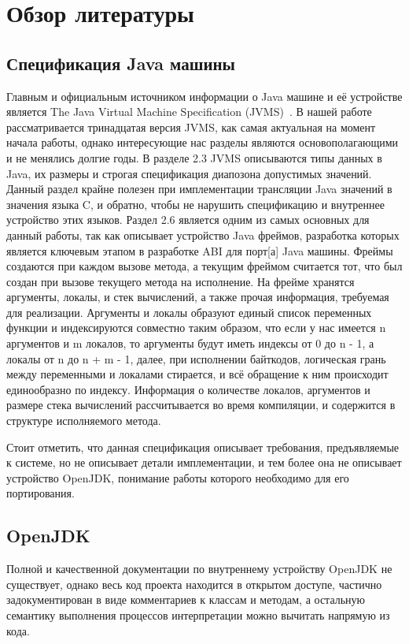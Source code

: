 \section*{Обзор литературы}

\subsection*{Спецификация Java машины}

Главным и официальным источником информации о Java машине и её устройстве является The Java Virtual Machine Specification (JVMS)~\cite{jvms}. В нашей работе рассматривается тринадцатая версия JVMS, как самая актуальная на момент начала работы, однако интересующие нас разделы являются основополагающими и не менялись долгие годы. 
В разделе 2.3 JVMS описываются типы данных в Java, их размеры и строгая спецификация диапозона допустимых значений. Данный раздел крайне полезен при имплементации трансляции Java значений в значения языка C, и обратно, чтобы не нарушить спецификацию и внутреннее устройство этих языков. Раздел 2.6 является одним из самых основных для данный работы, так как описывает устройство Java фреймов, разработка которых является ключевым этапом в разработке ABI для \gls{порт}[а] Java машины. Фреймы создаются при каждом вызове метода, а текущим фреймом считается тот, что был создан при вызове текущего метода на исполнение. На фрейме хранятся аргументы, локалы, и стек вычислений, а также прочая информация, требуемая для реализации. Аргументы и локалы образуют единый список переменных функции и индексируются совместно таким образом, что если у нас имеется n аргументов и m локалов, то аргументы будут иметь индексы от 0 до n - 1, а локалы от n до n + m - 1, далее, при исполнении байткодов, логическая грань между переменными и локалами стирается, и всё обращение к ним происходит единообразно по индексу. Информация о количестве локалов, аргументов и размере стека вычислений рассчитывается во время компиляции, и содержится в структуре исполняемого метода.

Стоит отметить, что данная спецификация описывает требования, предъявляемые к системе, но не описывает детали имплементации, и тем более она не описывает устройство OpenJDK, понимание работы которого необходимо для его портирования.


\subsection*{OpenJDK}

Полной и качественной документации по внутреннему устройству OpenJDK не существует, однако весь код проекта находится в открытом доступе, частично задокументирован в виде комментариев к классам и методам, а остальную семантику выполнения процессов интерпретации можно вычитать напрямую из кода\cite{hotspot}.

